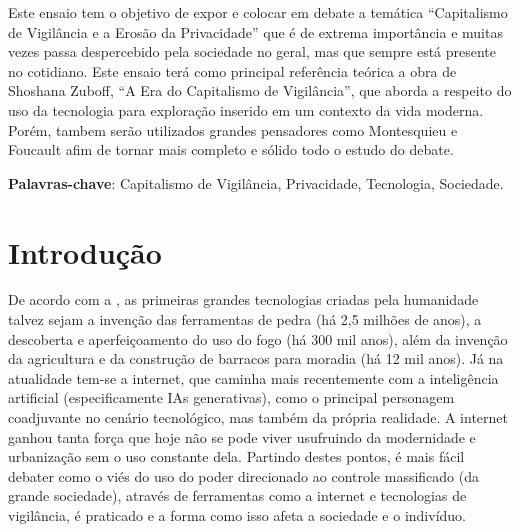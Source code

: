 \documentclass[
	12pt,
	openright,
	twoside,
	a4paper,
	english,
	french,
	spanish,
	brazil
]{abntex2}
\begin{document}
  \frenchspacing
  \imprimircapa
  \imprimirfolhaderosto*

  \setlength{\absparsep}{18pt}
  \begin{resumo}
    Este ensaio tem o objetivo de expor e colocar em debate a temática
    ``Capitalismo de Vigilância e a Erosão da Privacidade'' que é de extrema
    importância e muitas vezes passa despercebido pela sociedade no geral, mas
    que sempre está presente no cotidiano. Este ensaio terá como principal
    referência teórica a obra de Shoshana Zuboff, ``A Era do Capitalismo de
    Vigilância'', que aborda a respeito do uso da tecnologia para exploração
    inserido em um contexto da vida moderna. Porém, tambem serão utilizados
    grandes pensadores como Montesquieu e Foucault afim de tornar mais completo
    e sólido todo o estudo do debate.

    \textbf{Palavras-chave}:
      Capitalismo de Vigilância, Privacidade, Tecnologia, Sociedade.
  \end{resumo}


  \textual

  \chapter{Introdução}

  De acordo com a , as primeiras grandes tecnologias
  criadas pela humanidade talvez sejam a invenção das ferramentas de pedra (há
  2,5 milhões de anos), a descoberta e aperfeiçoamento do uso do fogo (há 300
  mil anos), além da invenção da agricultura e da construção de barracos para
  moradia (há 12 mil anos). Já na atualidade tem-se a internet, que caminha mais
  recentemente com a inteligência artificial (especificamente IAs generativas),
  como o principal personagem coadjuvante no cenário tecnológico, mas também da
  própria realidade. A internet ganhou tanta força que hoje não se pode viver
  usufruindo da modernidade e urbanização sem o uso constante dela. Partindo
  destes pontos, é mais fácil debater como o viés do uso do poder direcionado ao
  controle massificado (da grande sociedade), através de ferramentas como a
  internet e tecnologias de vigilância, é praticado e a forma como isso afeta a
  sociedade e o indivíduo.
\end{document}
